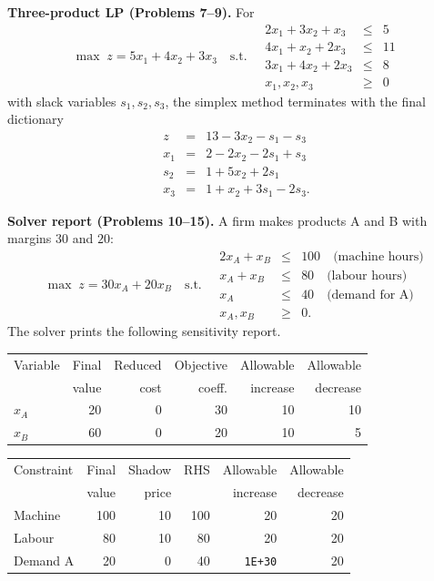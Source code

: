 \medskip
\noindent\textbf{Three-product LP (Problems 7--9).} For
\[
  \max\; z=5x_{1}+4x_{2}+3x_{3}
  \quad\text{s.t.}\quad
  \begin{array}{rcl}
    2x_{1}+3x_{2}+x_{3} &\le& 5\\
    4x_{1}+x_{2}+2x_{3} &\le& 11\\
    3x_{1}+4x_{2}+2x_{3} &\le& 8\\
    x_{1},x_{2},x_{3} &\ge& 0
  \end{array}
\]
with slack variables $s_{1},s_{2},s_{3}$, the simplex method terminates
with the final dictionary
\[
  \begin{array}{rcl}
    z     &=& 13-3x_{2}-s_{1}-s_{3}\\
    x_{1} &=& 2-2x_{2}-2s_{1}+s_{3}\\
    s_{2} &=& 1+5x_{2}+2s_{1}\\
    x_{3} &=& 1+x_{2}+3s_{1}-2s_{3} .
  \end{array}
\]

\medskip
\noindent\textbf{Solver report (Problems 10--15).} A firm makes products
A and B with margins $30$ and $20$:
\[
  \max\; z=30x_{A}+20x_{B}
  \quad\text{s.t.}\quad
  \begin{array}{rcl}
    2x_{A}+x_{B} &\le& 100 \quad\text{(machine hours)}\\
    x_{A}+x_{B}  &\le& 80  \quad\text{(labour hours)}\\
    x_{A}        &\le& 40  \quad\text{(demand for A)}\\
    x_{A},x_{B}  &\ge& 0 .
  \end{array}
\]
The solver prints the following sensitivity report.

\begin{center}
\begin{tabular}{|l|r|r|r|r|r|}
\hline
Variable & Final & Reduced & Objective & Allowable & Allowable\\
         & value & cost    & coeff.    & increase  & decrease\\
\hline
$x_{A}$ & 20 & 0 & 30 & 10 & 10\\
$x_{B}$ & 60 & 0 & 20 & 10 & 5\\
\hline
\end{tabular}

\medskip
\begin{tabular}{|l|r|r|r|r|r|}
\hline
Constraint & Final & Shadow & RHS & Allowable & Allowable\\
           & value & price  &     & increase  & decrease\\
\hline
Machine  & 100 & 10 & 100 & 20 & 20\\
Labour   & 80  & 10 & 80  & 20 & 20\\
Demand A & 20  & 0  & 40  & \texttt{1E+30} & 20\\
\hline
\end{tabular}
\end{center}

